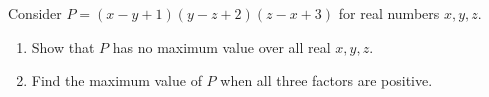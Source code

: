 Consider $P=(x-y+1)(y-z+2)(z-x+3)$ for real numbers $x,y,z$.
\begin{enumerate}
\item[(a)] Show that $P$ has no maximum value over all real $x,y,z$.
\item[(b)] Find the maximum value of $P$ when all three factors are positive.
\end{enumerate}
